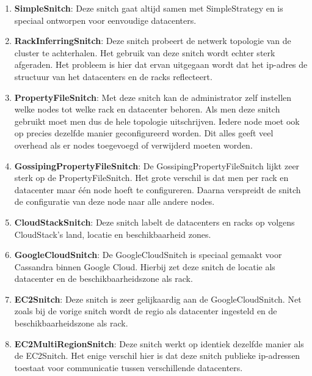\begin{enumerate}
	\item \textbf{SimpleSnitch}:
	Deze snitch gaat altijd samen met SimpleStrategy en is speciaal ontworpen voor eenvoudige datacenters.
	
	\item \textbf{RackInferringSnitch}:
	Deze snitch probeert de netwerk topologie van de cluster te achterhalen.
	Het gebruik van deze snitch wordt echter sterk afgeraden.
	Het probleem is hier dat ervan uitgegaan wordt dat het ip-adres de structuur van het datacenters en de racks reflecteert.
	
	\item \textbf{PropertyFileSnitch}:
	Met deze snitch kan de administrator zelf instellen welke nodes tot welke rack en datacenter behoren.
	Als men deze snitch gebruikt moet men dus de hele topologie uitschrijven. 
	Iedere node moet ook op precies dezelfde manier geconfigureerd worden.
	Dit alles geeft veel overhead als er nodes toegevoegd of verwijderd moeten worden.
	
	\item \textbf{GossipingPropertyFileSnitch}:
	De GossipingPropertyFileSnitch lijkt zeer sterk op de PropertyFileSnitch.
	Het grote verschil is dat men per rack en datacenter maar één node hoeft te configureren.
	Daarna verspreidt de snitch de configuratie van deze node naar alle andere nodes.
	
	\item \textbf{CloudStackSnitch}:
	Deze snitch labelt de datacenters en racks op volgens CloudStack's land, locatie en beschikbaarheid zones.
	
	\item \textbf{GoogleCloudSnitch}:
	De GoogleCloudSnitch is speciaal gemaakt voor Cassandra binnen Google Cloud.
	Hierbij zet deze snitch de locatie als datacenter en de beschikbaarheidszone als rack.
	
	\item \textbf{EC2Snitch}:
	Deze snitch is zeer gelijkaardig aan de GoogleCloudSnitch.
	Net zoals bij de vorige snitch wordt de regio als datacenter ingesteld en de beschikbaarheidszone als rack.
	
	\item \textbf{EC2MultiRegionSnitch}:
	Deze snitch werkt op identiek dezelfde manier als de EC2Snitch.
	Het enige verschil hier is dat deze snitch publieke ip-adressen toestaat voor communicatie tussen verschillende datacenters.
	
\end{enumerate}

